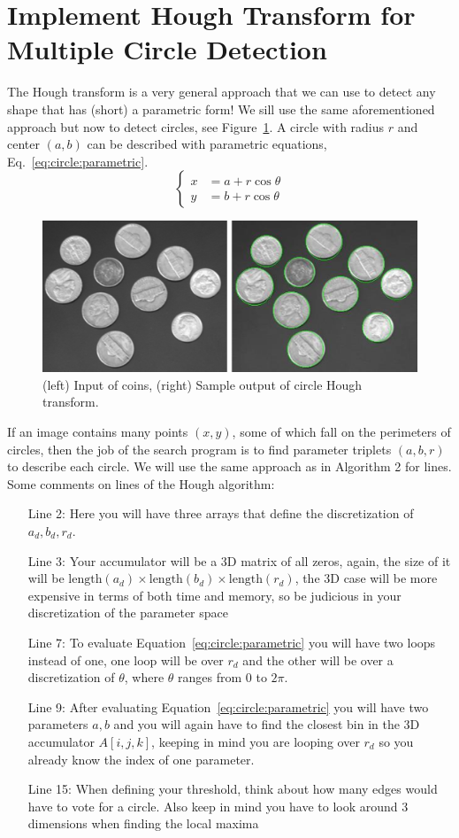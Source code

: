 \documentclass[a4paper]{article}
\begin{document}
\section{Implement Hough Transform for Multiple Circle Detection} The Hough transform is a very
general approach that we can use to detect any shape that has (short) a
parametric form! We sill use the same aforementioned approach but now to detect
circles, see Figure~\ref{fig:hough:circles}.  A circle with radius $r$ and
center $(a,b)$ can be described with parametric equations,
Eq.~\ref{eq:circle:parametric}.
\begin{equation}\label{eq:circle:parametric}
\left\{\begin{aligned}
x &= a + r\cos\theta\\
y &= b + r\cos\theta
\end{aligned}\right.
\end{equation}
\begin{figure}[h]
\centering
\includegraphics[width=0.8\linewidth]{figs/circular-hough.png}%
\caption{%
(left) Input of coins, (right) Sample output of circle Hough transform.
}\label{fig:hough:circles}
\end{figure}
If an image contains many points $(x,y)$, some of which fall on the perimeters of
circles, then the job of the search program is to find parameter triplets
$(a,b,r)$ to describe each circle. We will use the same approach as in Algorithm
2 for lines.
Some comments on lines of the Hough algorithm:
\begin{itemize}
\item[Line 2:] Here you will have three arrays that define the discretization
of $a_d, b_d, r_d$.
\item[Line 3:] Your accumulator will be a 3D matrix of all zeros, again, the
size of it will be
$\text{length}(a_d)\times\text{length}(b_d)\times\text{length}(r_d)$, the 3D
case will be more expensive in terms of both time and memory, so be
judicious in your discretization of the parameter space
\item[Line 7:] To evaluate Equation~\ref{eq:circle:parametric} you will have two
loops instead of one, one loop will be over $r_d$ and the other will be over a
discretization of $\theta$, where $\theta$ ranges from 0 to $2\pi$.
\item[Line 9:] After evaluating Equation~\ref{eq:circle:parametric} you will
have two parameters $a,b$ and you will again have to find the closest bin in the
3D accumulator $A[i,j,k]$, keeping in mind you are looping over $r_d$ so you
already know the index of one parameter.
\item[Line 15:] When defining your threshold, think about how many edges would
have to vote for a circle. Also keep in mind you have to look around 3
dimensions when finding the local maxima
\end{itemize}
\end{document}
